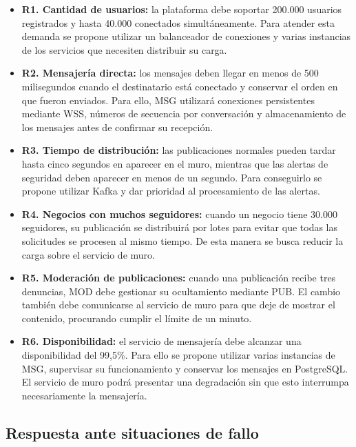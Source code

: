 \documentclass[12pt,a4paper]{article}
\begin{document}
\begin{itemize}

    \item \textbf{R1. Cantidad de usuarios:} la plataforma debe soportar 200.000 usuarios registrados y hasta 40.000 conectados simultáneamente. Para atender esta demanda se propone utilizar un balanceador de conexiones y varias instancias de los servicios que necesiten distribuir su carga.

    \item \textbf{R2. Mensajería directa:} los mensajes deben llegar en menos de 500 milisegundos cuando el destinatario está conectado y conservar el orden en que fueron enviados. Para ello, MSG utilizará conexiones persistentes mediante WSS, números de secuencia por conversación y almacenamiento de los mensajes antes de confirmar su recepción.

    \item \textbf{R3. Tiempo de distribución:} las publicaciones normales pueden tardar hasta cinco segundos en aparecer en el muro, mientras que las alertas de seguridad deben aparecer en menos de un segundo. Para conseguirlo se propone utilizar Kafka y dar prioridad al procesamiento de las alertas.

    \item \textbf{R4. Negocios con muchos seguidores:} cuando un negocio tiene 30.000 seguidores, su publicación se distribuirá por lotes para evitar que todas las solicitudes se procesen al mismo tiempo. De esta manera se busca reducir la carga sobre el servicio de muro.

    \item \textbf{R5. Moderación de publicaciones:} cuando una publicación recibe tres denuncias, MOD debe gestionar su ocultamiento mediante PUB. El cambio también debe comunicarse al servicio de muro para que deje de mostrar el contenido, procurando cumplir el límite de un minuto.

    \item \textbf{R6. Disponibilidad:} el servicio de mensajería
debe alcanzar una disponibilidad del 99,5\%. Para ello se
propone utilizar varias instancias de MSG, supervisar su
funcionamiento y conservar los mensajes en PostgreSQL.
El servicio de muro podrá presentar una degradación sin
que esto interrumpa necesariamente la mensajería.

\end{itemize}

\subsection{Respuesta ante situaciones de fallo}
\end{document}
